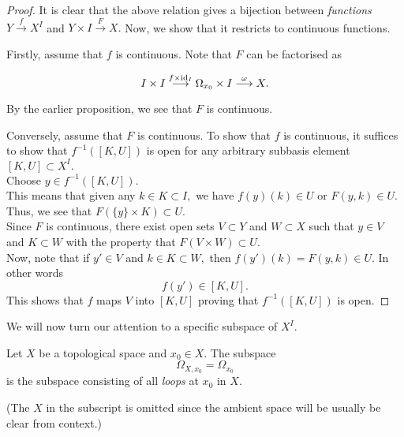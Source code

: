 \documentclass[12pt]{article}
\begin{document}
\begin{proof} 
	It is clear that the above relation gives a bijection between \emph{functions} $Y\overset{f}{\longrightarrow}X^I$ and $Y\times I\overset{F}{\longrightarrow}X.$ Now, we show that it restricts to continuous functions.

	Firstly, assume that $f$ is continuous. Note that $F$ can be factorised as

	\begin{equation*} 
		I \times I \overset{f \times \operatorname{id}_I}{\longrightarrow} \Omega_{x_0}\times I \overset{\omega}{\longrightarrow} X.
	\end{equation*}

	By the earlier proposition, we see that $F$ is continuous.

	Conversely, assume that $F$ is continuous. To show that $f$ is continuous, it suffices to show that $f^{-1}([K, U])$ is open for any arbitrary subbasis element $[K, U] \subset X^I.$\\
	Choose $y \in f^{-1}([K, U]).$ \\
	This means that given any $k \in K \subset I,$ we have $f(y)(k) \in U$ or $F(y, k) \in U.$ Thus, we see that $F(\{y\} \times K) \subset U.$\\
	Since $F$ is continuous, there exist open sets $V \subset Y$ and $W \subset X$ such that $y \in V$ and $K \subset W$ with the property that $F(V \times W) \subset U.$ \\
	Now, note that if $y' \in V$ and $k \in K \subset W,$ then $f(y')(k) = F(y, k) \in U.$ In other words
	\begin{equation*} 
		f(y') \in [K, U].
	\end{equation*}
	This shows that $f$ maps $V$ into $[K, U]$ proving that $f^{-1}([K, U])$ is open. 
\end{proof}

We will now turn our attention to a specific subspace of $X^I.$

\begin{defn}
	Let $X$ be a topological space and $x_0 \in X.$ The subspace
	\begin{equation*} 
		\Omega_{X, x_0} = \Omega_{x_0}
	\end{equation*}
	is the subspace consisting of all \emph{loops} at $x_0$ in $X.$
\end{defn}

(The $X$ in the subscript is omitted since the ambient space will be usually be clear from context.)
\end{document}
